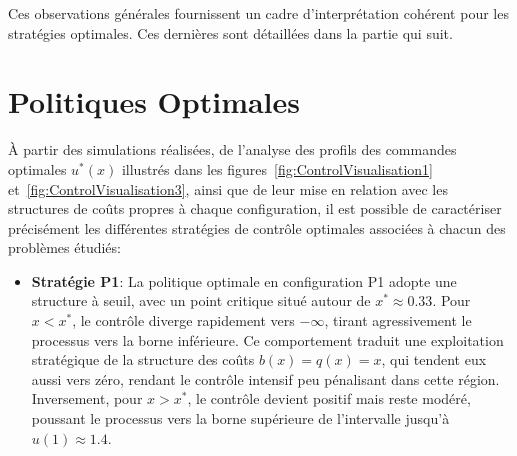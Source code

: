 Ces observations générales fournissent un cadre d'interprétation cohérent pour les stratégies optimales. Ces dernières sont détaillées dans la partie qui suit.
\section{Politiques Optimales}
À partir des simulations réalisées, de l'analyse des profils des commandes optimales \( u^*(x) \) illustrés dans les figures~\ref{fig:ControlVisualisation1} et~\ref{fig:ControlVisualisation3}, ainsi que de leur mise en relation avec les structures de coûts propres à chaque configuration, il est possible de caractériser précisément les différentes stratégies de contrôle optimales associées à chacun des problèmes étudiés:
\begin{itemize}
    \item \textbf{Stratégie P1}: La politique optimale en configuration P1 adopte une structure à seuil, avec un point critique situé autour de \(x^* \approx 0.33\). Pour \(x < x^*\), le contrôle diverge rapidement vers \(-\infty\), tirant agressivement le processus vers la borne inférieure. Ce comportement traduit une exploitation stratégique de la structure des coûts \(b(x) = q(x) = x\), qui tendent eux aussi vers zéro, rendant le contrôle intensif peu pénalisant dans cette région. Inversement, pour \(x > x^*\), le contrôle devient positif mais reste modéré, poussant le processus vers la borne supérieure de l'intervalle jusqu'à \(u(1)\approx1.4\).


\end{itemize}
